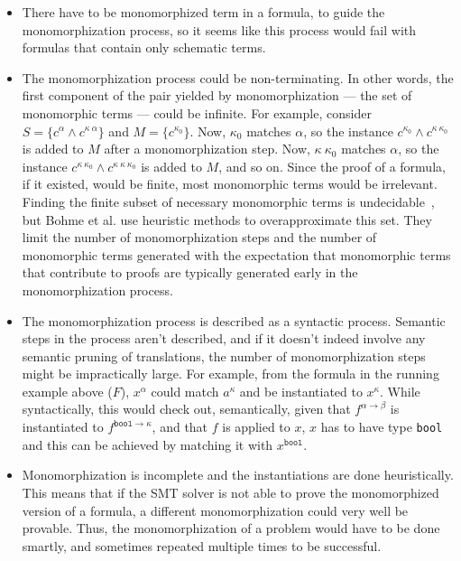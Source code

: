 \documentclass{article}
\begin{document}
		\begin{itemize}
		\item There have to be monomorphized 
			term in a formula, to guide the 
			monomorphization process, so it 
			seems like this process would 
			fail with formulas that contain 
			only schematic terms. 
		\item The monomorphization process 
			could be non-terminating. In 
			other words, the first component
			of the pair yielded by 
			monomorphization --- the 
			set of monomorphic terms ---
			could be infinite. For example,
			consider $S = \{c^{\alpha}
			\land c^{\kappa\ \alpha}\}$
			and $M = \{c^{\kappa_0}\}$.
			Now, $\kappa_0$ matches 
			$\alpha$, so the instance
			$c^{\kappa_0} \land 
			c^{\kappa\ \kappa_0}$ is added 
			to $M$ after a monomorphization 
			step. Now, $\kappa\ \kappa_0$
			matches $\alpha$, so the 
			instance $c^{\kappa\ \kappa_0} 
			\land c^{\kappa\ \kappa\ 
			\kappa_0}$ is added to $M$, 
			and so on. Since the proof of a 
			formula, if it existed, would 
			be finite, most monomorphic 
			terms would be irrelevant. 
			Finding the finite subset of 
			necessary monomorphic terms is 
			undecidable~\cite{10.1007/978-3-642-24364-6_7},
			but Bohme et al. use heuristic
			methods to overapproximate
			this set. They limit the 
			number of monomorphization 
			steps and the number of 
			monomorphic terms generated
			with the expectation that 
			monomorphic terms that 
			contribute to proofs 
			are typically generated early 
			in the monomorphization process.
		\item The monomorphization process
			is described as a syntactic 
			process. Semantic steps in 
			the process aren't described, 
			and if it doesn't indeed 
			involve	any semantic pruning of 
			translations, the number of 
			monomorphization steps 
			might be impractically large. 
			For example, from the formula 
			in the running example above ($F$), 
			$x^{\alpha}$ could match 
			$a^{\kappa}$ and be instantiated 
			to $x^{\kappa}$. While 
			syntactically, this would 
			check out, semantically, 
			given that $f^{\alpha \to \beta}$
			is instantiated to 
			$f^{\texttt{bool} \to \kappa}$, 
			and that $f$ is applied to $x$, 
			$x$ has to have type 
			\texttt{bool} and this can be 
			achieved by matching it with 
			$x^{\texttt{bool}}$.
		\item Monomorphization is 
			incomplete and the instantiations 
			are done heuristically. This 
			means that if the SMT solver 
			is not able to prove the 
			monomorphized version of a 
			formula, a different 
			monomorphization could 
			very well be provable. Thus, 
			the monomorphization of a 
			problem would have to be 
			done smartly, and sometimes
			repeated multiple times to 
			be successful. 
		\end{itemize} 
	
\end{document}
